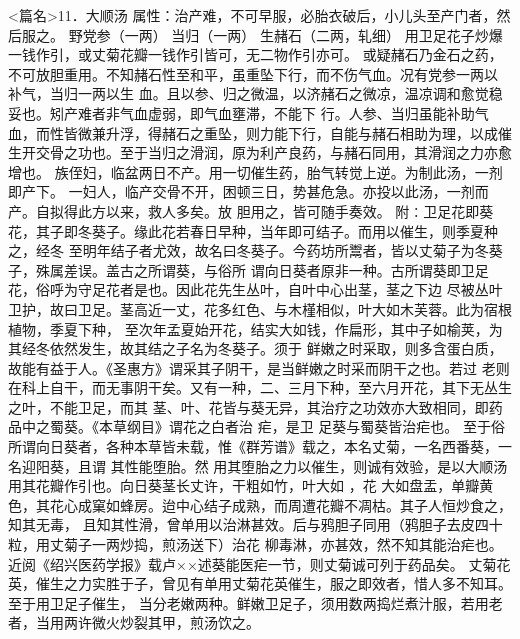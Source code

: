 \documentclass[a4paper,12pt,UTF8,twoside]{ctexbook}
\begin{document}
<篇名>11．大顺汤
属性：治产难，不可早服，必胎衣破后，小儿头至产门者，然后服之。 
野党参（一两） 当归（一两） 生赭石（二两，轧细） 
用卫足花子炒爆一钱作引，或丈菊花瓣一钱作引皆可，无二物作引亦可。 
或疑赭石乃金石之药，不可放胆重用。不知赭石性至和平，虽重坠下行，而不伤气血。况有党参一两以 
补气，当归一两以生 
血。且以参、归之微温，以济赭石之微凉，温凉调和愈觉稳妥也。矧产难者非气血虚弱，即气血壅滞，不能下 
行。人参、当归虽能补助气血，而性皆微兼升浮，得赭石之重坠，则力能下行，自能与赭石相助为理，以成催 
生开交骨之功也。至于当归之滑润，原为利产良药，与赭石同用，其滑润之力亦愈增也。 
族侄妇，临盆两日不产。用一切催生药，胎气转觉上逆。为制此汤，一剂即产下。 
一妇人，临产交骨不开，困顿三日，势甚危急。亦投以此汤，一剂而产。自拟得此方以来，救人多矣。放 
胆用之，皆可随手奏效。 
附∶卫足花即葵花，其子即冬葵子。缘此花若春日早种，当年即可结子。而用以催生，则季夏种之，经冬 
至明年结子者尤效，故名曰冬葵子。今药坊所鬻者，皆以丈菊子为冬葵子，殊属差误。盖古之所谓葵，与俗所 
谓向日葵者原非一种。古所谓葵即卫足花，俗呼为守足花者是也。因此花先生丛叶，自叶中心出茎，茎之下边 
尽被丛叶卫护，故曰卫足。茎高近一丈，花多红色、与木槿相似，叶大如木芙蓉。此为宿根植物，季夏下种， 
至次年孟夏始开花，结实大如钱，作扁形，其中子如榆荚，为其经冬依然发生，故其结之子名为冬葵子。须于 
鲜嫩之时采取，则多含蛋白质，故能有益于人。《圣惠方》谓采其子阴干，是当鲜嫩之时采而阴干之也。若过 
老则在科上自干，而无事阴干矣。又有一种，二、三月下种，至六月开花，其下无丛生之叶，不能卫足，而其 
茎、叶、花皆与葵无异，其治疗之功效亦大致相同，即药品中之蜀葵。《本草纲目》谓花之白者治 疟，是卫 
足葵与蜀葵皆治疟也。 
至于俗所谓向日葵者，各种本草皆未载，惟《群芳谱》载之，本名丈菊，一名西番葵，一名迎阳葵，且谓 
其性能堕胎。然 
用其堕胎之力以催生，则诚有效验，是以大顺汤用其花瓣作引也。向日葵茎长丈许，干粗如竹，叶大如 ，花 
大如盘盂，单瓣黄色，其花心成窠如蜂房。迨中心结子成熟，而周遭花瓣不凋枯。其子人恒炒食之，知其无毒， 
且知其性滑，曾单用以治淋甚效。后与鸦胆子同用（鸦胆子去皮四十粒，用丈菊子一两炒捣，煎汤送下）治花 
柳毒淋，亦甚效，然不知其能治疟也。近阅《绍兴医药学报》载卢××述葵能医疟一节，则丈菊诚可列于药品矣。 
丈菊花英，催生之力实胜于子，曾见有单用丈菊花英催生，服之即效者，惜人多不知耳。至于用卫足子催生， 
当分老嫩两种。鲜嫩卫足子，须用数两捣烂煮汁服，若用老者，当用两许微火炒裂其甲，煎汤饮之。 
\end{document}
